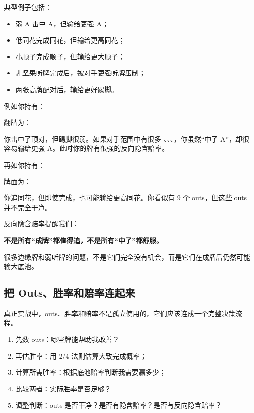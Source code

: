 典型例子包括：

\begin{itemize}
\item 弱 A 击中 A，但输给更强 A；
\item 低同花完成同花，但输给更高同花；
\item 小顺子完成顺子，但输给更大顺子；
\item 非坚果听牌完成后，被对手更强听牌压制；
\item 两张高牌配对后，输给更好踢脚。
\end{itemize}

例如你持有：

\begin{center}
\end{center}

翻牌为：

\begin{center}
\end{center}

你击中了顶对，但踢脚很弱。如果对手范围中有很多 、、、，你虽然“中了 A”，却很容易输给更强 A。此时你的牌有很强的反向隐含赔率。

再如你持有：

\begin{center}
\end{center}

牌面为：

\begin{center}
\end{center}

你追同花，但即使完成，也可能输给更高同花。你看似有 9 个 outs，但这些 outs 并不完全干净。

反向隐含赔率提醒我们：

\begin{center}
\textbf{不是所有“成牌”都值得追，不是所有“中了”都舒服。}
\end{center}

很多边缘牌和弱听牌的问题，不是它们完全没有机会，而是它们在成牌后仍然可能输大底池。

\subsection{把 Outs、胜率和赔率连起来}

真正实战中，outs、胜率和赔率不是孤立使用的。它们应该连成一个完整决策流程。

\begin{enumerate}
\item 先数 outs：哪些牌能帮助我改善？
\item 再估胜率：用 2/4 法则估算大致完成概率；
\item 计算所需胜率：根据底池赔率判断我需要赢多少；
\item 比较两者：实际胜率是否足够？
\item 调整判断：outs 是否干净？是否有隐含赔率？是否有反向隐含赔率？
\end{enumerate}

